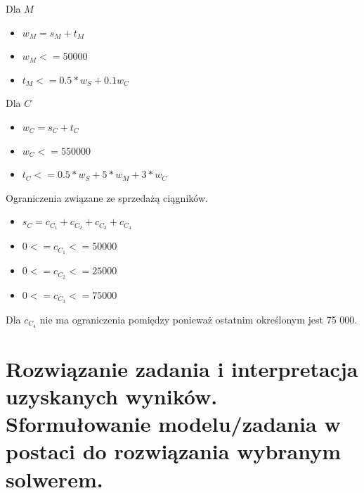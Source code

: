 \documentclass{article}
\begin{document}
Dla $M$

\begin{itemize}
  \item $w_M = s_M + t_M$
  \item $w_M <= 50000$
  \item $t_M <= 0.5 * w_S + 0.1 w_C$
\end{itemize}

Dla $C$

\begin{itemize}
  \item $w_C = s_C + t_C$
  \item $w_C <= 550000$
  \item $t_C <= 0.5 * w_S + 5 * w_M + 3 * w_C$
\end{itemize}


Ograniczenia związane ze sprzedażą ciągników.

\begin{itemize}
  \item $s_C = c_C_1 + c_C_2 + c_C_3 + c_C_4$
  \item $0 <= c_C_1 <= 50 000$
  \item $0 <= c_C_2 <= 25 000$
  \item $0 <= c_C_3 <= 75 000$
\end{itemize}

Dla $c_C_4$ nie ma ograniczenia pomiędzy ponieważ ostatnim określonym jest 75 000.


\section{Rozwiązanie zadania i interpretacja uzyskanych wyników. Sformułowanie modelu/zadania w  postaci  do  rozwiązania  wybranym  solwerem. }
\end{document}
